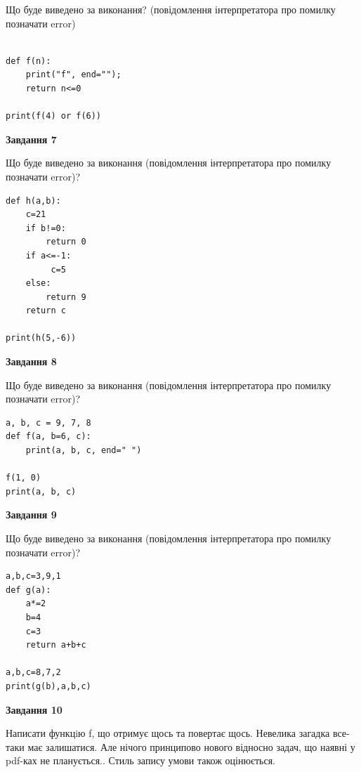 \documentclass[12pt, ukrainian]{article}
\begin{document}
{\begin {large}
Що буде виведено за виконання? (повідомлення інтерпретатора про помилку позначати error)\par
\begin{verbatim}

def f(n):
    print("f", end="");
    return n<=0

print(f(4) or f(6))
\end{verbatim}

{\begin {center}\textbf{Завдання 7}\end {center}}

Що буде виведено за виконання (повідомлення інтерпретатора про помилку позначати error)?\par
\begin{verbatim}
def h(a,b):
    c=21
    if b!=0:
        return 0
    if a<=-1:
         c=5
    else: 
        return 9
    return c

print(h(5,-6))
\end{verbatim}

{\begin {center}\textbf{Завдання 8}\end {center}}

Що буде виведено за виконання (повідомлення інтерпретатора про помилку позначати error)?\par
\begin{verbatim}
a, b, c = 9, 7, 8
def f(a, b=6, c):
    print(a, b, c, end=" ")

f(1, 0)
print(a, b, c)
\end{verbatim}

{\begin {center}\textbf{Завдання 9}\end {center}}

Що буде виведено за виконання (повідомлення інтерпретатора про помилку позначати error)?\par
\begin{verbatim}
a,b,c=3,9,1
def g(a):
    a*=2
    b=4
    c=3
    return a+b+c

a,b,c=8,7,2
print(g(b),a,b,c)
\end{verbatim}

{\begin {center}\textbf{Завдання 10}\end {center}}


Написати функцiю f, що отримує щось та повертає щось. Невелика загадка все-таки має залишатися. Але нічого принципово нового відносно задач, що наявні у pdf-ках не планується.. Стиль запису умови також оцінюється.\par
\end {large}}
\newpage
\end{document}

